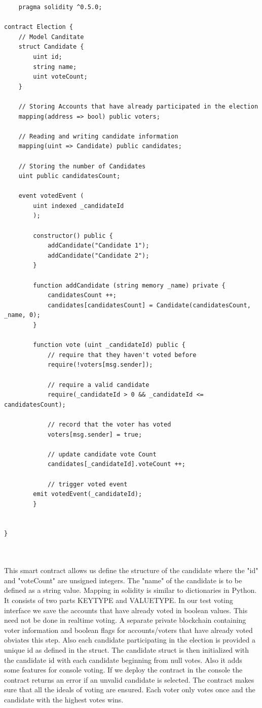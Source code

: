 \documentclass{report}
\begin{document}
\begin{verbatim}
    pragma solidity ^0.5.0;

contract Election {
    // Model Canditate
    struct Candidate {
        uint id;
        string name;
        uint voteCount;
    }

    // Storing Accounts that have already participated in the election
    mapping(address => bool) public voters;

    // Reading and writing candidate information
    mapping(uint => Candidate) public candidates;

    // Storing the number of Candidates
    uint public candidatesCount;

    event votedEvent (
        uint indexed _candidateId
        );

        constructor() public {
            addCandidate("Candidate 1");
            addCandidate("Candidate 2");
        }

        function addCandidate (string memory _name) private {
            candidatesCount ++;
            candidates[candidatesCount] = Candidate(candidatesCount, _name, 0);
        }

        function vote (uint _candidateId) public {
            // require that they haven't voted before
            require(!voters[msg.sender]);

            // require a valid candidate
            require(_candidateId > 0 && _candidateId <= candidatesCount);

            // record that the voter has voted
            voters[msg.sender] = true;

            // update candidate vote Count
            candidates[_candidateId].voteCount ++;

            // trigger voted event
        emit votedEvent(_candidateId);
        }


}              
\end{verbatim}
\\
\\
This smart contract allows us define the structure of the candidate where the "id" and "voteCount" are unsigned integers. The "name" of the candidate is to be defined as a string value. Mapping in solidity is similar to dictionaries in Python. It consists of two parts KEYTYPE and VALUETYPE. In our test voting interface we save the accounts that have already voted in boolean values. This need not be done in realtime voting. A separate private blockchain containing voter information and boolean flags for accounts/voters that have already voted obviates this step. Also each candidate participating in the election is provided a unique id as defined in the struct. The candidate struct is then initialized with the candidate id with each candidate beginning from null votes. Also it adds some features for console voting. If we deploy the contract in the console the contract returns an error if an unvalid candidate is selected. The contract makes sure that all the ideals of voting are ensured. Each voter only votes once and the candidate with the highest votes wins.
\end{document}
